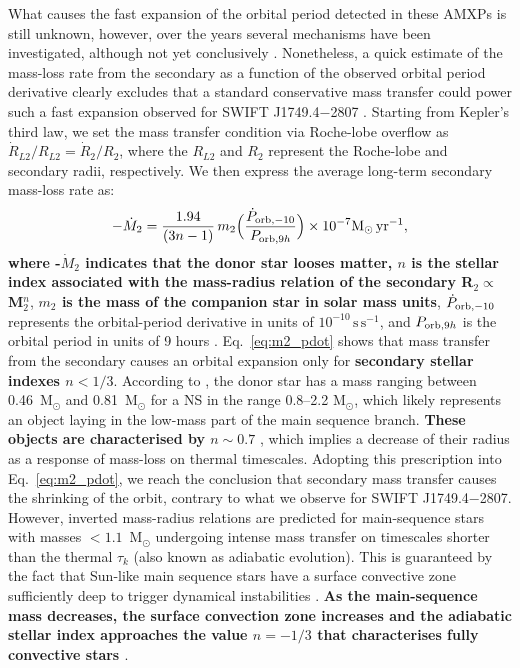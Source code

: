 \documentclass[fleqn,usenatbib]{mnras}
\newcommand{\swiftj}{SWIFT J1749.4$-$2807}
\begin{document}
What causes the fast expansion of the orbital period detected in these AMXPs is still unknown, however, over the years several mechanisms have been investigated, although not yet conclusively \citep[see e.g.,][]{di-Salvo:2008uu, Hartman:2008uj,Burderi:2009td, Patruno:2012tw, Sanna:2017vj, Sanna:2018tx}. Nonetheless, a quick estimate of the mass-loss rate from the secondary as a function of the observed orbital period derivative clearly excludes that a standard conservative mass transfer could power such a fast expansion observed for \swiftj{} \citep[similar conclusions have been drawn for SAX J1808.4$-$3658, see e.g.,][]{Sanna:2017vj}. Starting from Kepler's third law, we set the mass transfer condition via Roche-lobe overflow as $\dot{R}_{L2}/R_{L2}=\dot{R}_2/R_{2}$, where the $R_{L2}$ and $R_{2}$ represent the Roche-lobe and secondary radii, respectively. We then express the average long-term secondary mass-loss rate as: 
\begin{eqnarray}
\label{eq:m2_pdot}
-\dot{M}_{2}=\frac{1.94}{(3n-1)}\,m_{2}\Big(\frac{\dot{P}_{{\rm orb},-10}}{P_{{\rm orb},9h}}\Big)\times 10^{-7} \text{M}_{\odot}\, \text{yr}^{-1},
\end{eqnarray}
\textbf{where -$\dot{M}_{2}$ indicates that the donor star looses matter, $n$ is the stellar index associated with the mass-radius relation of the secondary R$_2\propto$ M$_2^n$}, \textbf{$m_{2}$ is the mass of the companion star in solar mass units}, $\dot{P}_{{\rm orb},-10}$ represents the orbital-period derivative in units of $10^{-10}\,\text{s}\,\text{s}^{-1}$, and $P_{{\rm orb},9h}$ is the orbital period in units of 9 hours \citep[see e.g.,][for more details on the derivation of the expression]{Burderi:2010tk}. Eq.~\ref{eq:m2_pdot} shows that mass transfer from the secondary causes an orbital expansion only for \textbf{secondary stellar indexes $n<1/3$}. According to \citet{Markwardt:2010tl}, the donor star has a mass ranging between 0.46~M$_\odot$ and 0.81~M$_\odot$ for a NS in the range 0.8--2.2 M$_\odot$, which likely represents an object laying in the low-mass part of the main sequence branch. \textbf{These objects are characterised by $n \sim 0.7$} \citep[see e.g.,][]{Chabrier:2009vh}, which implies a decrease of their radius as a response of mass-loss on thermal timescales. Adopting this prescription into Eq.~\ref{eq:m2_pdot}, we reach the conclusion that secondary mass transfer causes the shrinking of the orbit, contrary to what we observe for \swiftj{}. However, inverted mass-radius relations are predicted for main-sequence stars with masses $<1.1$~M$_{\odot}$ undergoing intense mass transfer on timescales shorter than the thermal $\tau_k$ (also known as adiabatic evolution). This is guaranteed by the fact that Sun-like main sequence stars have a surface convective zone sufficiently deep to trigger dynamical instabilities \citep[see e.g.,][]{Ge:2015ug}. \textbf{As the main-sequence mass decreases, the surface convection zone increases and the adiabatic stellar index approaches the value $n=-1/3$ that characterises fully convective stars \citep[well described with a polytrope index 3/2, see e.g.,][]{Rappaport:1982vc}}. 
\end{document}
